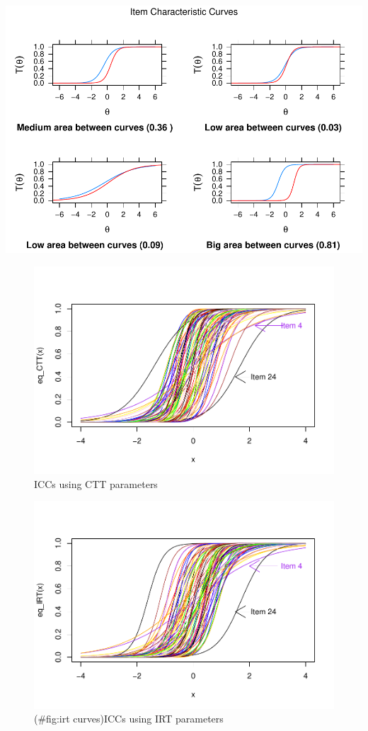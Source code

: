 \documentclass[
  english,
  man]{apa6}
\begin{document}
\includegraphics{ICC_project_files/figure-latex/plotting-1.pdf}

\begin{figure}
\centering
\includegraphics{ICC_project_files/figure-latex/AUC-1.pdf}
\caption{\label{fig:AUC}ICCs using CTT parameters}
\end{figure}

\begin{figure}
\centering
\includegraphics{ICC_project_files/figure-latex/irt curves-1.pdf}
\caption{(\#fig:irt curves)ICCs using IRT parameters}
\end{figure}
\end{document}
